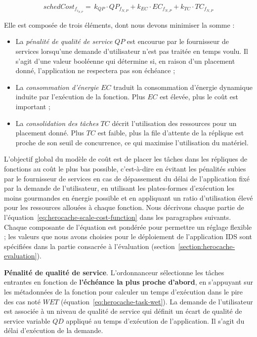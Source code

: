 \begin{equation}
    schedCost_{{f}_{{i}_{N, P}}} = \, k_{QP} \cdot QP_{{f}_{N, P}} + k_{EC} \cdot {EC}_{{f}_{N, P}} + k_{TC} \cdot TC_{{f}_{N, P}}
\label{eq:herocache-scheduling-cost-function}
\end{equation}

Elle est composée de trois éléments, dont nous devons minimiser la somme :

\begin{itemize}
    \item La \textit{pénalité de qualité de service} $QP$ est encourue par le fournisseur de services lorsqu'une demande d'utilisateur n'est pas traitée en temps voulu. Il s'agit d'une valeur booléenne qui détermine si, en raison d'un placement donné, l'application ne respectera pas son échéance ;
    \item La \textit{consommation d'énergie} $EC$ traduit la consommation d'énergie dynamique induite par l'exécution de la fonction. Plus $EC$ est élevée, plus le coût est important ;
    \item La \textit{consolidation des tâches} $TC$ décrit l'utilisation des ressources pour un placement donné. Plus $TC$ est faible, plus la file d'attente de la réplique est proche de son seuil de concurrence, ce qui maximise l'utilisation du matériel.
\end{itemize}

L'objectif global du modèle de coût est de placer les tâches dans les répliques de fonctions au coût le plus bas possible, c'est-à-dire en évitant les pénalités subies par le fournisseur de services en cas de dépassement du délai de l'application fixé par la demande de l'utilisateur, en utilisant les plates-formes d'exécution les moins gourmandes en énergie possible et en appliquant un ratio d'utilisation élevé pour les ressources allouées à chaque fonction. Nous décrivons chaque partie de l'équation~\ref{eq:herocache-scale-cost-function} dans les paragraphes suivants. Chaque composante de l'équation est pondérée pour permettre un réglage flexible ; les valeurs que nous avons choisies pour le déploiement de l'application IDS sont spécifiées dans la partie consacrée à l'évaluation (section~\ref{section:herocache-evaluation}).

\textbf{Pénalité de qualité de service}. L'ordonnanceur sélectionne les tâches entrantes en fonction de \textbf{l'échéance la plus proche d'abord}, en s'appuyant sur les métadonnées de la fonction pour calculer un temps d'exécution dans le pire des cas noté $WET$ (équation~\ref{eq:herocache-task-wet}). La demande de l'utilisateur est associée à un niveau de qualité de service qui définit un écart de qualité de service variable $QD$ appliqué au temps d'exécution de l'application. Il s'agit du délai d'exécution de la demande.


